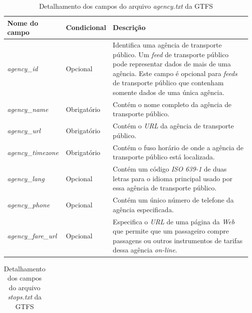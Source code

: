 \documentclass[
	12pt,				%
	oneside,			%
	a4paper,			%
	english,			%
	brazil				%
	]{abntex2ppgsi}
\begin{document}
{{\begin{apendicesenv}
\begin{table}[!htb]
\centering
  \caption{Detalhamento dos campos do arquivo \textit{agency.txt} da GTFS}
      \label{tab:gtfsAgency}
\begin{tabular}{>{\centering\arraybackslash}m{3.5cm} | >{\centering}m{3cm} | >{\centering\arraybackslash}m{8cm}}
\hline
\textbf{Nome do campo} & \textbf{Condicional} & \textbf{Descrição} \\
\hline
\textit{agency\_id} & Opcional & Identifica uma agência de transporte público. Um \textit{feed} de transporte público pode representar dados de mais de uma agência. Este campo é opcional para \textit{feeds} de transporte público que contenham somente dados de uma única agência. \\
\hline
\textit{agency\_name} & Obrigatório & Contém o nome completo da agência de transporte público. \\
\hline
\textit{agency\_url} & Obrigatório & Contém o \textit{URL} da agência de transporte público. \\
\hline
\textit{agency\_timezone} & Obrigatório & Contém o fuso horário de onde a agência de transporte público está localizada. \\
\hline
\textit{agency\_lang} & Opcional & Contém um código \textit{ISO 639-1} de duas letras para o idioma principal usado por essa agência de transporte público. \\
\hline
\textit{agency\_phone} & Opcional & Contém um único número de telefone da agência especificada. \\
\hline
\textit{agency\_fare\_url} & Opcional & Especifica o \textit{URL} de uma página da \textit{Web} que permite que um passageiro compre passagens ou outros instrumentos de tarifas dessa agência \textit{on-line}. \\
\hline
\end{tabular}
\end{table}
\vspace{-\baselineskip}

\clearpage

\begin{longtable}[!htb]{>{\centering\arraybackslash}m{3.8cm} | >{\centering}m{2.5cm} | >{\centering\arraybackslash}m{8.5cm}}
  \caption{Detalhamento dos campos do arquivo \textit{stops.txt} da GTFS}
      \label{tab:gtfsStops} \\

\hline \multicolumn{1}{>{\centering\arraybackslash}m{3.8cm} |}{\textbf{Nome do campo}} & \multicolumn{1}{>{\centering}m{2.5cm} | }{\textbf{Condicional}} & \multicolumn{1}{>{\centering\arraybackslash}m{8.5cm}}{\textbf{Descrição}}\\ \hline 
\endfirsthead


\end{longtable}
\end{apendicesenv}}}
\end{document}
